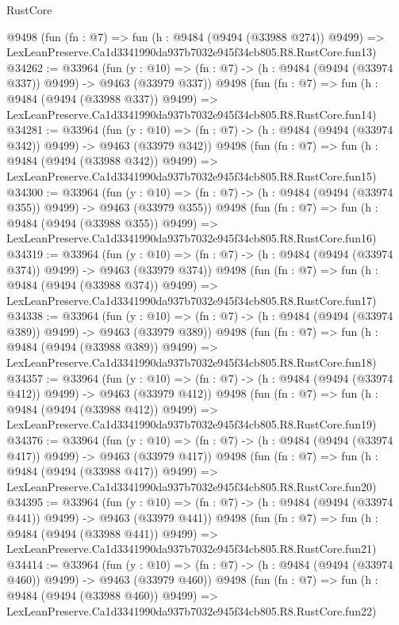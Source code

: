 \begin{lexlean}{RustCore}
\begin{coremodule}
    @9498
    (fun (fn : @7) =>
    fun (h : @9484 (@9494 (@33988 @274)) @9499) =>
    LexLeanPreserve.Ca1d3341990da937b7032e945f34cb805.R8.RustCore.fun13)
@34262 := @33964
    (fun (y : @10) => (fn : @7) -> (h : @9484 (@9494 (@33974 @337)) @9499) -> @9463 (@33979 @337))
    @9498
    (fun (fn : @7) =>
    fun (h : @9484 (@9494 (@33988 @337)) @9499) =>
    LexLeanPreserve.Ca1d3341990da937b7032e945f34cb805.R8.RustCore.fun14)
@34281 := @33964
    (fun (y : @10) => (fn : @7) -> (h : @9484 (@9494 (@33974 @342)) @9499) -> @9463 (@33979 @342))
    @9498
    (fun (fn : @7) =>
    fun (h : @9484 (@9494 (@33988 @342)) @9499) =>
    LexLeanPreserve.Ca1d3341990da937b7032e945f34cb805.R8.RustCore.fun15)
@34300 := @33964
    (fun (y : @10) => (fn : @7) -> (h : @9484 (@9494 (@33974 @355)) @9499) -> @9463 (@33979 @355))
    @9498
    (fun (fn : @7) =>
    fun (h : @9484 (@9494 (@33988 @355)) @9499) =>
    LexLeanPreserve.Ca1d3341990da937b7032e945f34cb805.R8.RustCore.fun16)
@34319 := @33964
    (fun (y : @10) => (fn : @7) -> (h : @9484 (@9494 (@33974 @374)) @9499) -> @9463 (@33979 @374))
    @9498
    (fun (fn : @7) =>
    fun (h : @9484 (@9494 (@33988 @374)) @9499) =>
    LexLeanPreserve.Ca1d3341990da937b7032e945f34cb805.R8.RustCore.fun17)
@34338 := @33964
    (fun (y : @10) => (fn : @7) -> (h : @9484 (@9494 (@33974 @389)) @9499) -> @9463 (@33979 @389))
    @9498
    (fun (fn : @7) =>
    fun (h : @9484 (@9494 (@33988 @389)) @9499) =>
    LexLeanPreserve.Ca1d3341990da937b7032e945f34cb805.R8.RustCore.fun18)
@34357 := @33964
    (fun (y : @10) => (fn : @7) -> (h : @9484 (@9494 (@33974 @412)) @9499) -> @9463 (@33979 @412))
    @9498
    (fun (fn : @7) =>
    fun (h : @9484 (@9494 (@33988 @412)) @9499) =>
    LexLeanPreserve.Ca1d3341990da937b7032e945f34cb805.R8.RustCore.fun19)
@34376 := @33964
    (fun (y : @10) => (fn : @7) -> (h : @9484 (@9494 (@33974 @417)) @9499) -> @9463 (@33979 @417))
    @9498
    (fun (fn : @7) =>
    fun (h : @9484 (@9494 (@33988 @417)) @9499) =>
    LexLeanPreserve.Ca1d3341990da937b7032e945f34cb805.R8.RustCore.fun20)
@34395 := @33964
    (fun (y : @10) => (fn : @7) -> (h : @9484 (@9494 (@33974 @441)) @9499) -> @9463 (@33979 @441))
    @9498
    (fun (fn : @7) =>
    fun (h : @9484 (@9494 (@33988 @441)) @9499) =>
    LexLeanPreserve.Ca1d3341990da937b7032e945f34cb805.R8.RustCore.fun21)
@34414 := @33964
    (fun (y : @10) => (fn : @7) -> (h : @9484 (@9494 (@33974 @460)) @9499) -> @9463 (@33979 @460))
    @9498
    (fun (fn : @7) =>
    fun (h : @9484 (@9494 (@33988 @460)) @9499) =>
    LexLeanPreserve.Ca1d3341990da937b7032e945f34cb805.R8.RustCore.fun22)

\end{coremodule}
\end{lexlean}
